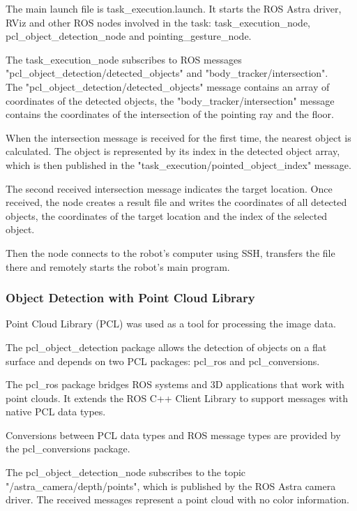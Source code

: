 The main launch file is task\_execution.launch. It starts the ROS Astra driver, RViz and other ROS nodes involved in the task: task\_execution\_node, pcl\_object\_detection\_node and pointing\_gesture\_node.\par
The task\_execution\_node subscribes to ROS messages\\
"pcl\_object\_detection/detected\_objects" and "body\_tracker/intersection".\\
The "pcl\_object\_detection/detected\_objects" message contains an array of coordinates of the detected objects, the "body\_tracker/intersection" message contains the coordinates of the intersection of the pointing ray and the floor.\par
When the intersection message is received for the first time, the nearest object is calculated. The object is represented by its index in the detected object array, which is then published in the "task\_execution/pointed\_object\_index" message.\par
The second received intersection message indicates the target location.
Once received, the node creates a result file and writes the coordinates of all detected objects, the coordinates of the target location and the index of the selected object.\par
Then the node connects to the robot's computer using SSH, transfers the file there and remotely starts the robot's main program.\par


\subsubsection{Object Detection with Point Cloud Library}
Point Cloud Library (PCL) was used as a tool for processing the image data.\par
The pcl\_object\_detection package allows the detection of objects on a flat surface and depends on two PCL packages: pcl\_ros and pcl\_conversions.\par
The pcl\_ros package bridges ROS systems and 3D applications that work with point clouds. It extends the ROS C++ Client Library to support messages with native PCL data types.\par
Conversions between PCL data types and ROS message types are provided by the pcl\_conversions package.\par
The pcl\_object\_detection\_node subscribes to the topic \\"/astra\_camera/depth/points", which is published by the ROS Astra camera driver. The received messages represent a point cloud with no color information.\par


